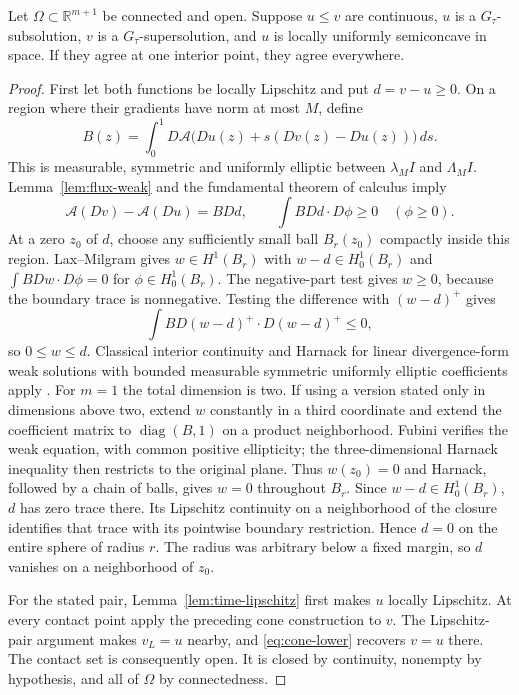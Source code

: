 \begin{theorem}\label{thm:contact}
Let $\Omega\subset\mathbb R^{m+1}$ be connected and open. Suppose
$u\leq v$ are continuous, $u$ is a $G_\tau$-subsolution, $v$ is a
$G_\tau$-supersolution, and $u$ is locally uniformly semiconcave in
space. If they agree at one interior point, they agree everywhere.
\end{theorem}
\begin{proof}
First let both functions be locally Lipschitz and put $d=v-u\geq0$.
On a region where their gradients have norm at most $M$, define
\[
 B(z)=\int_0^1D\mathcal A\bigl(Du(z)+s(Dv(z)-Du(z))\bigr)\,ds.
\]
This is measurable, symmetric and uniformly elliptic between
$\lambda_MI$ and $\Lambda_MI$. Lemma~\ref{lem:flux-weak} and the
fundamental theorem of calculus imply
\[
 \mathcal A(Dv)-\mathcal A(Du)=B Dd,\qquad
 \int B Dd\cdot D\phi\geq0\quad(\phi\geq0).
\]
At a zero $z_0$ of $d$, choose any sufficiently small ball $B_r(z_0)$
compactly inside this region. Lax--Milgram gives $w\in H^1(B_r)$ with
$w-d\in H^1_0(B_r)$ and
$\int BDw\cdot D\phi=0$ for $\phi\in H^1_0(B_r)$.
The negative-part test gives $w\geq0$, because the boundary trace is
nonnegative. Testing the difference with $(w-d)^+$ gives
\[
 \int BD(w-d)^+\cdot D(w-d)^+\leq0,
\]
so $0\leq w\leq d$. Classical interior continuity and Harnack for
linear divergence-form weak solutions with bounded measurable
symmetric uniformly elliptic coefficients apply
\cite[Sections 2--3]{Crescimbeni}. For $m=1$ the total dimension is
two. If using a version stated only in dimensions above two,
extend $w$ constantly in a third coordinate and extend the coefficient
matrix to $\operatorname{diag}(B,1)$ on a product neighborhood.
Fubini verifies the weak equation, with common positive ellipticity;
the three-dimensional Harnack inequality then restricts to the
original plane. Thus $w(z_0)=0$ and Harnack,
followed by a chain of balls, gives $w=0$ throughout $B_r$.
Since $w-d\in H^1_0(B_r)$, $d$ has zero trace there. Its Lipschitz
continuity on a neighborhood of the closure identifies that trace
with its pointwise boundary restriction. Hence $d=0$ on the entire
sphere of radius $r$. The radius was arbitrary below a fixed margin,
so $d$ vanishes on a neighborhood of $z_0$.

For the stated pair, Lemma~\ref{lem:time-lipschitz} first makes $u$
locally Lipschitz. At every contact point apply the preceding cone
construction to $v$. The Lipschitz-pair argument makes $v_L=u$
nearby, and \eqref{eq:cone-lower} recovers $v=u$ there. The contact
set is consequently open. It is closed by continuity, nonempty by
hypothesis, and all of $\Omega$ by connectedness.
\end{proof}

